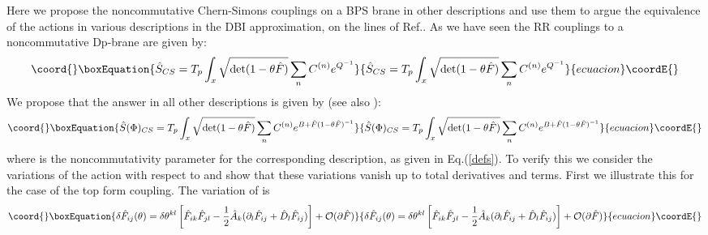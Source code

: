 \documentclass[a4paper,a4paper]{amsproc}
\theoremstyle{definition}
\theoremstyle{remark}
\numberwithin{equation}{section}
\begin{document}
Here we propose the noncommutative Chern-Simons couplings on a BPS
brane in other descriptions and use them to argue the equivalence of
the actions in various descriptions in the DBI approximation, on the
lines of Ref.\cite{SW}. As we have seen the RR couplings to a
noncommutative Dp-brane are given by:
%
\begin{equation}\coord{}\boxEquation{
\hat{S}_{CS} = T_p \int_x {\sqrt{\hbox{det}(1-\theta \hat F)}}
\sum_nC^{(n)}e^{Q^{-1}}
}{
\hat{S}_{CS} = T_p \int_x {\sqrt{\hbox{det}(1-\theta \hat F)}}
\sum_nC^{(n)}e^{Q^{-1}}
}{ecuacion}\coordE{}\end{equation}
%
We propose that the answer in all other descriptions is given by (see
also \cite{micheliutwo}):
%
\begin{equation}\coord{}\boxEquation{
\hat{S}(\Phi)_{CS} = T_p \int_x {\sqrt{\hbox{det}(1-\theta \hat F)}}
\sum_nC^{(n)}e^{B+\hat F(1-\theta\hat F)^{-1}}
}{
\hat{S}(\Phi)_{CS} = T_p \int_x {\sqrt{\hbox{det}(1-\theta \hat F)}}
\sum_nC^{(n)}e^{B+\hat F(1-\theta\hat F)^{-1}}
}{ecuacion}\coordE{}\end{equation}
%
where \myHighlight{$\theta$}\coordHE{} is the noncommutativity parameter for the corresponding
description, as given in Eq.(\ref{defs}). To verify this we consider
the variations of the action with respect to \myHighlight{$\theta$}\coordHE{} and show that
these variations vanish up to total derivatives and
\coordHE{} terms. First we illustrate this for
the case of the top form coupling. The variation of \coordHE{} is
\cite{SW}
%
\begin{equation}\coord{}\boxEquation{
\delta {\hat F}_{ij}(\theta) = \delta\theta^{kl}\left[{\hat
F}_{ik}{\hat F}_{jl} -\frac{1}{2}{\hat A}_k(\partial_l {\hat F}_{ij} +
{\hat D}_l {\hat F}_{ij})\right] + {\mathcal{O}}(\partial{\hat F}) 
}{
\delta {\hat F}_{ij}(\theta) = \delta\theta^{kl}\left[{\hat
F}_{ik}{\hat F}_{jl} -\frac{1}{2}{\hat A}_k(\partial_l {\hat F}_{ij} +
{\hat D}_l {\hat F}_{ij})\right] + {\mathcal{O}}(\partial{\hat F}) 
}{ecuacion}\coordE{}\end{equation}
\end{document}
